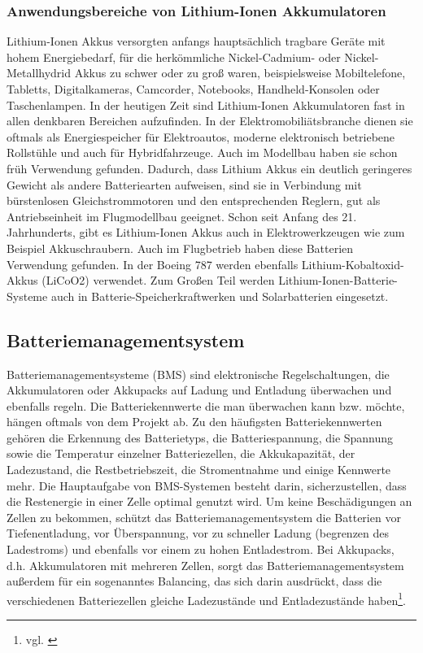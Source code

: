 \subsubsection{Anwendungsbereiche von Lithium-Ionen Akkumulatoren}
Lithium-Ionen Akkus versorgten anfangs hauptsächlich tragbare Geräte mit hohem Energiebedarf, für die herkömmliche Nickel-Cadmium- oder Nickel-Metallhydrid Akkus zu schwer oder zu groß waren, beispielsweise Mobiltelefone, Tabletts, Digitalkameras, Camcorder, Notebooks, Handheld-Konsolen oder Taschenlampen. In der heutigen Zeit sind Lithium-Ionen Akkumulatoren fast in allen denkbaren Bereichen aufzufinden. In der Elektromobiliätsbranche dienen sie oftmals als Energiespeicher für Elektroautos, moderne elektronisch betriebene Rollstühle und auch für Hybridfahrzeuge. Auch im Modellbau haben sie schon früh Verwendung gefunden. Dadurch, dass Lithium Akkus ein deutlich geringeres Gewicht als andere Batteriearten aufweisen, sind sie in Verbindung mit bürstenlosen Gleichstrommotoren und den entsprechenden Reglern, gut als Antriebseinheit im Flugmodellbau geeignet. Schon seit Anfang des 21. Jahrhunderts, gibt es Lithium-Ionen Akkus auch in Elektrowerkzeugen wie zum Beispiel Akkuschraubern. Auch im Flugbetrieb haben diese Batterien Verwendung gefunden. In der Boeing 787 werden ebenfalls Lithium-Kobaltoxid-Akkus (LiCoO2) verwendet. Zum Großen Teil werden Lithium-Ionen-Batterie-Systeme auch in Batterie-Speicherkraftwerken und Solarbatterien eingesetzt.
\newpage


\subsection{Batteriemanagementsystem}
\label{Batteriemanagementsystem}
Batteriemanagementsysteme (BMS) sind elektronische Regelschaltungen, die Akkumulatoren oder Akkupacks auf Ladung und Entladung überwachen und ebenfalls regeln. Die Batteriekennwerte die man überwachen kann bzw. möchte, hängen oftmals von dem Projekt ab. Zu den häufigsten Batteriekennwerten gehören die Erkennung des Batterietyps, die Batteriespannung, die Spannung sowie die Temperatur einzelner Batteriezellen, die Akkukapazität, der Ladezustand, die Restbetriebszeit, die Stromentnahme und einige Kennwerte mehr. Die Hauptaufgabe von BMS-Systemen besteht darin, sicherzustellen, dass die Restenergie in einer Zelle optimal genutzt wird. Um keine Beschädigungen an Zellen zu bekommen, schützt das Batteriemanagementsystem die Batterien vor Tiefenentladung, vor Überspannung, vor zu schneller Ladung (begrenzen des Ladestroms) und ebenfalls vor einem zu hohen Entladestrom. Bei Akkupacks, d.h. Akkumulatoren mit mehreren Zellen, sorgt das Batteriemanagementsystem außerdem für ein sogenanntes Balancing, das sich darin ausdrückt, dass die verschiedenen Batteriezellen gleiche Ladezustände und Entladezustände haben\footnote{vgl. \cite{GrundschaltungBMS}}.

